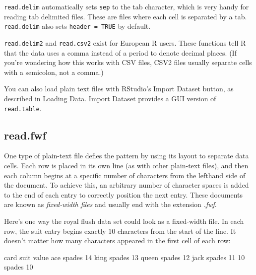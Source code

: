\documentclass[
  letterpaper,
  DIV=11,
  numbers=noendperiod]{scrbook}
\newenvironment{Shaded}{\begin{snugshade}}{\end{snugshade}}
\newcommand{\NormalTok}[1]{\textcolor[rgb]{0.00,0.23,0.31}{#1}}
\begin{document}
\texttt{read.delim} automatically sets \texttt{sep} to the tab
character, which is very handy for reading tab delimited files. These
are files where each cell is separated by a tab. \texttt{read.delim}
also sets \texttt{header\ =\ TRUE} by default.

\texttt{read.delim2} and \texttt{read.csv2} exist for European R users.
These functions tell R that the data uses a comma instead of a period to
denote decimal places. (If you're wondering how this works with CSV
files, CSV2 files usually separate cells with a semicolon, not a comma.)

\begin{tcolorbox}[enhanced jigsaw, breakable, colback=white, colbacktitle=quarto-callout-tip-color!10!white, arc=.35mm, bottomrule=.15mm, coltitle=black, left=2mm, rightrule=.15mm, colframe=quarto-callout-tip-color-frame, leftrule=.75mm, opacitybacktitle=0.6, bottomtitle=1mm, toptitle=1mm, titlerule=0mm, opacityback=0, title=\textcolor{quarto-callout-tip-color}{\faLightbulb}\hspace{0.5em}{Import Dataset}, toprule=.15mm]

You can also load plain text files with RStudio's Import Dataset button,
as described in \hyperref[loading]{Loading Data}. Import Dataset
provides a GUI version of \texttt{read.table}.

\end{tcolorbox}

\subsection{read.fwf}\label{read.fwf}

One type of plain-text file defies the pattern by using its layout to
separate data cells. Each row is placed in its own line (as with other
plain-text files), and then each column begins at a specific number of
characters from the lefthand side of the document. To achieve this, an
arbitrary number of character spaces is added to the end of each entry
to correctly position the next entry. These documents are known as
\emph{fixed-width files} and usually end with the extension \emph{.fwf}.

Here's one way the royal flush data set could look as a fixed-width
file. In each row, the suit entry begins exactly 10 characters from the
start of the line. It doesn't matter how many characters appeared in the
first cell of each row:

\begin{Shaded}
\begin{Highlighting}[]
\NormalTok{card      suit       value}
\NormalTok{ace       spades     14}
\NormalTok{king      spades     13  }
\NormalTok{queen     spades     12  }
\NormalTok{jack      spades     11  }
\NormalTok{10        spades     10}
\end{Highlighting}
\end{Shaded}
\end{document}
